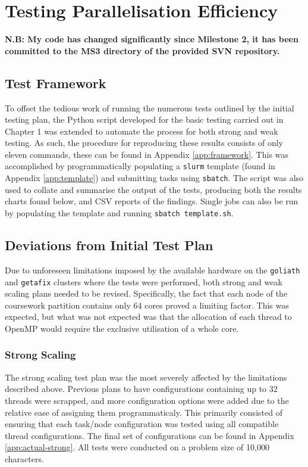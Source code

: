 \newcommand\ddfrac[2]{\frac{\displaystyle #1}{\displaystyle #2}}

\chapter{Testing Parallelisation Efficiency}

\textbf{N.B: My code has changed significantly since Milestone 2, it has been committed to the MS3 directory of the provided SVN repository.}

\section{Test Framework}
To offset the tedious work of running the numerous tests outlined by the initial testing plan, the Python script developed for the basic testing carried out in Chapter 1 was extended to automate the process for both strong and weak testing. As such, the procedure for reproducing these results consists of only eleven commands, these can be found in Appendix \ref{app:framework}. 
This was accomplished by programmatically populating a \lstinline{slurm} template (found in Appendix \ref{app:template}) and submitting tasks using \lstinline{sbatch}. The script was also used to collate and summarise the output of the tests, producing both the results charts found below, and CSV reports of the findings. Single jobs can also be run by populating the template and running \lstinline{sbatch template.sh}.

\section{Deviations from Initial Test Plan}
Due to unforeseen limitations imposed by the available hardware on the \lstinline{goliath} and \lstinline{getafix} clusters where the tests were performed, both strong and weak scaling plans needed to be revised. Specifically, the fact that each node of the coursework partition contains only 64 cores proved a limiting factor. This was expected, but what was not expected was that the allocation of each thread to OpenMP would require the exclusive utilisation of a whole core.

\subsection{Strong Scaling}
The strong scaling test plan was the most severely affected by the limitations described above. Previous plans to have configurations containing up to 32 threads were scrapped, and more configuration options were added due to the relative ease of assigning them programmaticaly. This primarily consisted of ensuring that each task/node configuration was tested using all compatible thread configurations. The final set of configurations can be found in Appendix \ref{app:actual-strong}. All tests were conducted on a problem size of 10,000 characters.

